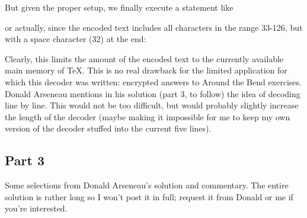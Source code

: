 But given the proper setup, we finally execute a statement like
or actually, since the encoded text includes all characters in the range
33-126, but with a space character (32) at the end:
Clearly, this limits the amount of the encoded text to the currently
available main memory of TeX. This is no real drawback for the limited
application for which this decoder was written: encrypted answers to
Around the Bend exercises. Donald Arseneau mentions in his solution
(part 3, to follow) the idea of decoding line by line. This would not be
too difficult, but would probably slightly increase the length of the
decoder (maybe making it impossible for me to keep my own version of the
decoder stuffed into the current five lines).

\begin{comment}
Michael Downes %
mjd@math.ams.org (Internet) ASCII 32--54,55--126: !"#$%
789:;<=>?@ABCDEFGHIJKLMNOPQRSTUVWXYZ[\]^_`abcdefghijklmnopqrstuvwxyz{|}~
Date: 18 Aug 1994 15:37:41 -0400 (EDT)
From: Michael Downes <MJD@MATH.AMS.ORG>
Subject: Around the Bend #11, solutions, part 3 of 4
To: info-tex@shsu.edu
X-ListName: TeX-Related Network Discussion List <INFO-TeX@SHSU.edu>
\end{comment}

\subsection{Part 3}

Some selections from Donald Arseneau's solution and commentary. The
entire solution is rather long so I won't post it in full; request it
from Donald or me if you're interested.

